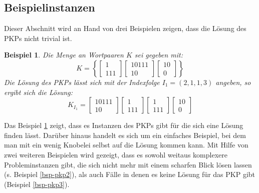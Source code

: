 \documentclass[]{scrartcl}
\newtheorem{bsp}[definition]{Beispiel}
\begin{document}
	\subsection{Beispielinstanzen}
		
		Dieser Abschnitt wird an Hand von drei Beispielen zeigen, dass die Lösung des PKPs nicht trivial ist.

		\begin{bsp}
			\label{bsp-pkp1}
			Die Menge an Wortpaaren $K$ sei gegeben mit: \[K = \left\lbrace \begin{bmatrix}
					1 \\ 111
				\end{bmatrix}
				\begin{bmatrix}
					10111 \\ 10
				\end{bmatrix}
				\begin{bmatrix}
					10 \\ 0
				\end{bmatrix}\right\rbrace \]
				Die Lösung des PKPs lässt sich mit der Indexfolge $I_1 = (2, 1, 1, 3)$ angeben, so ergibt sich die Lösung:
				\[K_{I_1} = \begin{bmatrix}
								10111 \\ 10
							\end{bmatrix} \begin{bmatrix}
								1 \\ 111
							\end{bmatrix} \begin{bmatrix}
								1 \\ 111
							\end{bmatrix} \begin{bmatrix}
								10 \\ 0
							\end{bmatrix}\]
		\end{bsp}
		
		Das Beispiel \ref{bsp-pkp1} zeigt, dass es Instanzen des PKPs gibt für die sich eine Lösung finden lässt. Darüber hinaus handelt es sich um ein einfaches Beispiel, bei dem man mit ein wenig Knobelei selbst auf die Lösung kommen kann. Mit Hilfe von zwei weiteren Beispielen wird gezeigt, dass es sowohl weitaus komplexere Probleminstanzen gibt, die sich nicht mehr mit einem scharfen Blick lösen lassen (s. Beispiel \ref{bsp-pkp2}), als auch Fälle in denen es keine Lösung für das PKP gibt (Beispiel \ref{bsp-pkp3}).
		
\end{document}

